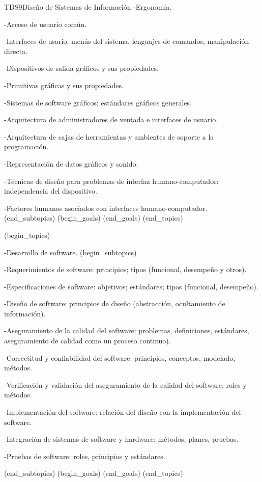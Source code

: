 \begin{BKL2}{TDS9}{Diseño de Sistemas de Información}
-Ergonomía.

-Acceso de usuario común.

-Interfaces de usario; menús del sistema, lenguajes de comandos, manipulación directa.

-Dispositivos de salida gráficos y sus propiedades.

-Primitivas gráficas y sus propiedades.

-Sistemas de software gráficos; estándares gráficos generales.

-Arquitectura de administradores de ventada e interfaces de usuario.

-Arquitectura de cajas de herramientas y ambientes de soporte a la programación.

-Representación de datos gráficos y sonido.

-Técnicas de diseño para problemas de interfaz humano-computador: independencia del dispositivo.

-Factores humanos asociados con interfaces humano-computador.
(end_subtopics)
(begin_goals)
(end_goals)
(end_topics)

 

(begin_topics)

-Desarrollo de software.
(begin_subtopics)

-Requerimientos de software: principios; tipos (funcional, desempeño y otros).

-Especificaciones de software: objetivos; estándares; tipos (funcional, desempeño).

-Diseño de software: principios de diseño (abstracción, ocultamiento de información).

-Aseguramiento de la calidad del software: problemas, definiciones, estándares, aseguramiento de calidad como un proceso continuo).

-Correctitud y confiabilidad del software: principios, conceptos, modelado, métodos.

-Verificación y validación del aseguramiento de la calidad del software: roles y métodos.

-Implementación del software: relación del diseño con la implementación del software.

-Integración de sistemas de software y hardware: métodos, planes, pruebas.

-Pruebas de software: roles, principios y estándares.

(end_subtopics)
(begin_goals)
(end_goals)
(end_topics)

\end{BKL2}



